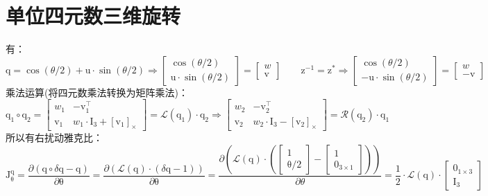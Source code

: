 \documentclass[12pt, onecolumn]{article}
\newcommand\normf{\fangsong}
\newcommand\skewmat[1]{\left[ #1 \right]_\times}
\newcommand\bsm[1]{\boldsymbol{\mathrm{#1}}}
\begin{document}
	\section{\normf 单位四元数三维旋转}
	有：
	\begin{equation}
	\bsm{q}=\cos(\theta/2) +\bsm{u}\cdot\sin(\theta/2)\Rightarrow\begin{bmatrix}
	\cos(\theta/2)\\\bsm{u}\cdot\sin(\theta/2)
	\end{bmatrix}=\begin{bmatrix}
			w\\\bsm{v}
			\end{bmatrix}
	\qquad
	\bsm{z}^{-1}=\bsm{z}^*\Rightarrow\begin{bmatrix}
		\cos(\theta/2)\\-\bsm{u}\cdot\sin(\theta/2)
		\end{bmatrix}=\begin{bmatrix}
								w\\-\bsm{v}
								\end{bmatrix}
	\end{equation}
	乘法运算(将四元数乘法转换为矩阵乘法)：
	\begin{equation}
	\bsm{q}_1\circ\bsm{q}_2=\begin{bmatrix}
	w_1&-\bsm{v}_1^\top\\\bsm{v}_1&
	w_1\cdot\bsm{I}_3+\skewmat{\bsm{v}_1}
	\end{bmatrix}=\mathcal{L}(\bsm{q}_1)\cdot\bsm{q}_2
	\Rightarrow
	\begin{bmatrix}
	w_2&-\bsm{v}_2^\top\\\bsm{v}_2&
	w_2\cdot\bsm{I}_3-\skewmat{\bsm{v}_2}
	\end{bmatrix}=\mathcal{R}(\bsm{q}_2)\cdot\bsm{q}_1
	\end{equation}
	所以有右扰动雅克比：
	\begin{equation}
	\bsm{J}^{\bsm{q}}_{\bsm{\theta}}=\frac{\partial \left( \bsm{q}\circ\delta\bsm{q}-\bsm{q}\right) }{\partial \bsm{\theta}}
	=\frac{\partial \left( \mathcal{L}(\bsm{q})\cdot\left( \delta\bsm{q}-\bsm{1}\right) \right) }{\partial \bsm{\theta}}
	=\frac{\partial \left( \mathcal{L}(\bsm{q})\cdot\left( \begin{bmatrix}
	1\\\bsm{\theta}/2
	\end{bmatrix}-\begin{bmatrix}
		1\\\bsm{0}_{3\times 1}
		\end{bmatrix}\right) \right) }{\partial \theta}
	=\frac{1}{2}\cdot\mathcal{L}(\bsm{q})\cdot\begin{bmatrix}
			\bsm{0}_{1\times 3}\\\bsm{I}_3
			\end{bmatrix}
	\end{equation}
\end{document}

